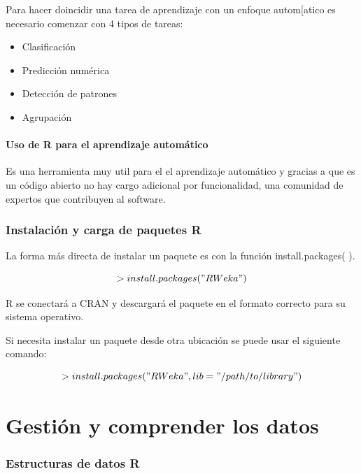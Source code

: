 \documentclass[
  letterpaper,
  DIV=11,
  numbers=noendperiod]{scrartcl}
\let\oldparagraph\paragraph
\renewcommand{\paragraph}[1]{\oldparagraph{#1}\mbox{}}
\begin{document}
Para hacer doincidir una tarea de aprendizaje con un enfoque
autom{[}atico es necesario comenzar con 4 tipos de tareas:

\begin{itemize}
\item
  Clasificación
\item
  Predicción numérica
\item
  Detección de patrones
\item
  Agrupación
\end{itemize}

\hypertarget{uso-de-r-para-el-aprendizaje-automuxe1tico}{%
\paragraph{Uso de R para el aprendizaje
automático}\label{uso-de-r-para-el-aprendizaje-automuxe1tico}}

Es una herramienta muy util para el el aprendizaje automático y gracias
a que es un código abierto no hay cargo adicional por funcionalidad, una
comunidad de expertos que contribuyen al software.

\hypertarget{instalaciuxf3n-y-carga-de-paquetes-r}{%
\subsubsection{Instalación y carga de paquetes
R}\label{instalaciuxf3n-y-carga-de-paquetes-r}}

La forma más directa de instalar un paquete es con la función
install.packages( ).

\[>install.packages("RWeka")\]

R se conectará a CRAN y descargará el paquete en el formato correcto
para su sistema operativo.

Si necesita instalar un paquete desde otra ubicación se puede usar el
siguiente comando:

\[>install.packages("RWeka", lib="/path/to/library")\]

\hypertarget{gestiuxf3n-y-comprender-los-datos}{%
\section{Gestión y comprender los
datos}\label{gestiuxf3n-y-comprender-los-datos}}

\hypertarget{estructuras-de-datos-r}{%
\subsubsection{Estructuras de datos R}\label{estructuras-de-datos-r}}
\end{document}

